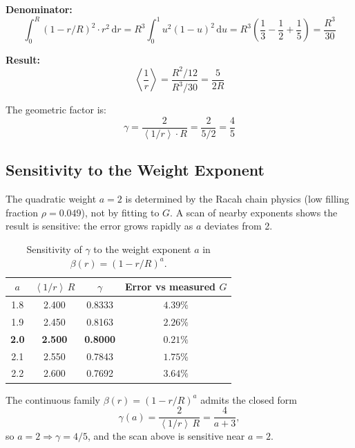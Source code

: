 \documentclass[11pt,letterpaper]{article}
\newcommand{\av}[1]{\left\langle #1 \right\rangle}
\begin{document}
\noindent\textbf{Denominator:}
\begin{equation}
  \int_0^R (1 - r/R)^2 \cdot r^2 \, \mathrm{d}r
  = R^3 \int_0^1 u^2(1-u)^2 \, \mathrm{d}u
  = R^3 \left(\frac{1}{3} - \frac{1}{2} + \frac{1}{5}\right)
  = \frac{R^3}{30}
  \label{eq:denominator}
\end{equation}

\noindent\textbf{Result:}
\begin{equation}
  \av{\frac{1}{r}} = \frac{R^2/12}{R^3/30} = \frac{5}{2R}
  \label{eq:avg_result}
\end{equation}

The geometric factor is:
\begin{equation}
  \gamma = \frac{2}{\av{1/r} \cdot R} = \frac{2}{5/2} = \frac{4}{5}
  \label{eq:gamma}
\end{equation}

\subsection{Sensitivity to the Weight Exponent}

The quadratic weight $a = 2$ is determined by the Racah chain physics
(low filling fraction $\rho = 0.049$), not by fitting to $G$. A scan
of nearby exponents shows the result is sensitive: the error grows
rapidly as $a$ deviates from 2.

\begin{table}[H]
  \centering
  \caption[Sensitivity to weight exponent]{Sensitivity of $\gamma$ to the weight exponent $a$ in $\beta(r) = (1-r/R)^a$.}
  \label{tab:sensitivity}
  \begin{tabular}{cccc}
    \toprule
    $a$ & $\av{1/r}\,R$ & $\gamma$ & Error vs measured $G$ \\
    \midrule
    1.8 & 2.400 & 0.8333 & $4.39\%$ \\
    1.9 & 2.450 & 0.8163 & $2.26\%$ \\
    \textbf{2.0} & \textbf{2.500} & \textbf{0.8000} & \textbf{$0.21\%$} \\
    2.1 & 2.550 & 0.7843 & $1.75\%$ \\
    2.2 & 2.600 & 0.7692 & $3.64\%$ \\
    \bottomrule
  \end{tabular}
\end{table}

The continuous family $\beta(r) = (1-r/R)^a$ admits the closed form
\begin{equation}
  \gamma(a) = \frac{2}{\av{1/r}\,R} = \frac{4}{a+3},
  \label{eq:gamma_of_a}
\end{equation}
so $a = 2 \Rightarrow \gamma = 4/5$, and the scan above is sensitive near
$a = 2$.
\end{document}
